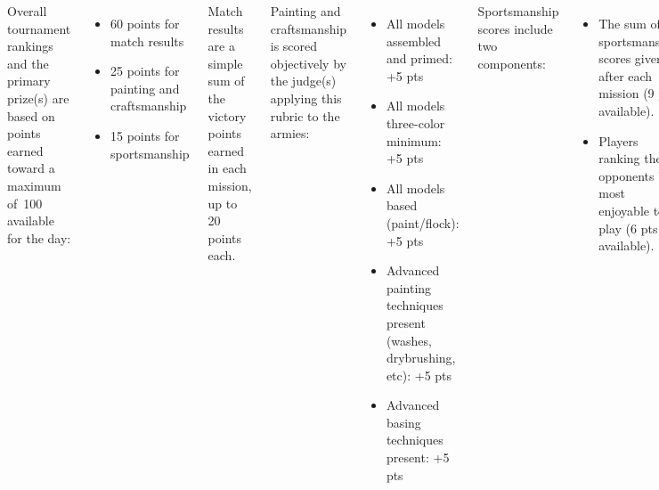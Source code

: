 \documentclass{40k}
\begin{document}
\begin{columns}
Overall tournament rankings and the primary prize(s) are based on
points earned toward a maximum of~100 available for the day:
\begin{itemize}\shortlist
\item 60 points for match results
\item 25 points for painting and craftsmanship
\item 15 points for sportsmanship
\end{itemize}

Match results are a simple sum of the victory points earned in each
mission, up to 20 points each.

Painting and craftsmanship is scored objectively by the judge(s)
applying this rubric to the armies:

\begin{itemize}\shortlist
\item All models assembled and primed: +5 pts
\item All models three-color minimum: +5 pts
\item All models based (paint/flock): +5 pts
\item Advanced painting techniques present (washes, drybrushing, etc): +5 pts
\item Advanced basing techniques present: +5 pts
\end{itemize}

Sportsmanship scores include two components:
\begin{itemize}\shortlist
\item The sum of sportsmanship scores given after each mission (9 pts
  available).

\item Players ranking their opponents by most enjoyable to play (6 pts
  available).
\end{itemize}

Please make sure to submit sportsmanship scores as appropriate,
including the final ranking, as otherwise it impairs your opponents'
overall scores!

\end{columns}




\clearpage
{}
\end{document}
